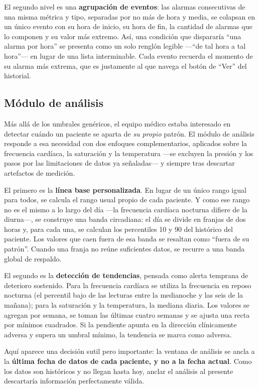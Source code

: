 \documentclass[12pt,a4paper]{article}
\begin{document}
    El segundo nivel es una \textbf{agrupación de eventos}: las alarmas consecutivas de una misma métrica y tipo, separadas por no más de hora y media, se colapsan en un único evento con su hora de inicio, su hora de fin, la cantidad de alarmas que lo componen y su valor más extremo. Así, una condición que dispararía ``una alarma por hora'' se presenta como un solo renglón legible —``de tal hora a tal hora''— en lugar de una lista interminable. Cada evento recuerda el momento de su alarma más extrema, que es justamente al que navega el botón de ``Ver'' del historial.

    \subsection{Módulo de análisis}
    Más allá de los umbrales genéricos, el equipo médico estaba interesado en detectar cuándo un paciente se aparta de \textit{su propio} patrón. El módulo de análisis responde a esa necesidad con dos enfoques complementarios, aplicados sobre la frecuencia cardíaca, la saturación y la temperatura —se excluyen la presión y los pasos por las limitaciones de datos ya señaladas— y siempre tras descartar artefactos de medición.

    El primero es la \textbf{línea base personalizada}. En lugar de un único rango igual para todos, se calcula el rango usual propio de cada paciente. Y como ese rango no es el mismo a lo largo del día —la frecuencia cardíaca nocturna difiere de la diurna—, se construye una banda circadiana: el día se divide en franjas de dos horas y, para cada una, se calculan los percentiles 10 y 90 del histórico del paciente. Los valores que caen fuera de esa banda se resaltan como ``fuera de su patrón''. Cuando una franja no reúne suficientes datos, se recurre a una banda global de respaldo.

    El segundo es la \textbf{detección de tendencias}, pensada como alerta temprana de deterioro sostenido. Para la frecuencia cardíaca se utiliza la frecuencia en reposo nocturna (el percentil bajo de las lecturas entre la medianoche y las seis de la mañana); para la saturación y la temperatura, la mediana diaria. Los valores se agregan por semana, se toman las últimas cuatro semanas y se ajusta una recta por mínimos cuadrados. Si la pendiente apunta en la dirección clínicamente adversa y supera un umbral mínimo, la tendencia se marca como adversa.

    Aquí aparece una decisión sutil pero importante: la ventana de análisis se ancla a la \textbf{última fecha de datos de cada paciente, y no a la fecha actual}. Como los datos son históricos y no llegan hasta hoy, anclar el análisis al presente descartaría información perfectamente válida.
\end{document}
